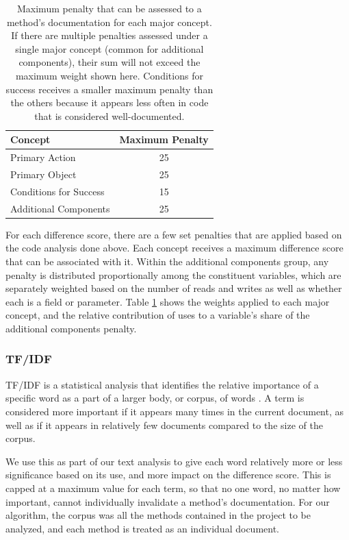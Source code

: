 \documentclass[preprint]{sigplanconf}
\begin{document}
\begin{table}
	\begin{center}
		\begin{tabular}{ l | c }
		Concept & Maximum Penalty \\
		\hline
		Primary Action & 25 \\
		Primary Object & 25 \\
		Conditions for Success & 15 \\
		Additional Components & 25 \\
		\end{tabular}
	\end{center}
	\caption{Maximum penalty that can be assessed to a method's documentation for each major concept. If there are multiple penalties assessed under a single major concept (common for additional components), their sum will not exceed the maximum weight shown here. Conditions for success receives a smaller maximum penalty than the others because it appears less often in code that is considered well-documented.}
	\label{table-concept-penalty}
\end{table}

For each difference score, there are a few set penalties that are applied based on the code analysis done above. Each concept receives a maximum difference score that can be associated with it. Within the additional components group, any penalty is distributed proportionally among the constituent variables, which are separately weighted based on the number of reads and writes as well as whether each is a field or parameter. Table \ref{table-concept-penalty} shows the weights applied to each major concept, and the relative contribution of uses to a variable's share of the additional components penalty.

\subsubsection{TF/IDF}
TF/IDF is a statistical analysis that identifies the relative importance of a specific word as a part of a larger body, or corpus, of words \cite{stanford}. A term is considered more important if it appears many times in the current document, as well as if it appears in relatively few documents compared to the size of the corpus.

We use this as part of our text analysis to give each word relatively more or less significance based on its use, and more impact on the difference score. This is capped at a maximum value for each term, so that no one word, no matter how important, cannot individually invalidate a method's documentation. For our algorithm, the corpus was all the methods contained in the project to be analyzed, and each method is treated as an individual document.
\end{document}
